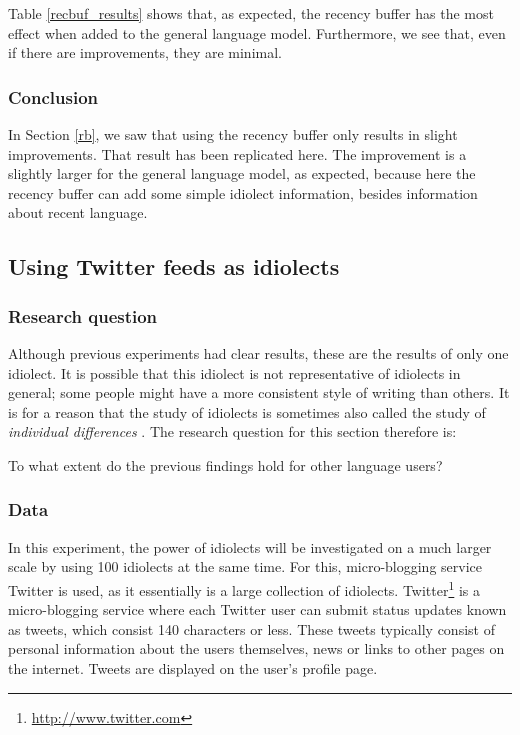 \documentclass[11pt]{article}
\begin{document}
Table \ref{recbuf_results} shows that, as expected, the recency buffer has the most effect when added to the general language model. Furthermore, we see that, even if there are improvements, they are minimal.

\subsubsection{Conclusion}
In Section \ref{rb}, we saw that using the recency buffer only results in slight improvements. That result has been replicated here. The improvement is a slightly larger for the general language model, as expected, because here the recency buffer can add some simple idiolect information, besides information about recent language.

\subsection{Using Twitter feeds as idiolects} \label{twitter_idiolects}

\subsubsection{Research question}
Although previous experiments had clear results, these are the results of only one idiolect. It is possible that this idiolect is not representative of idiolects in general; some people might have a more consistent style of writing than others. It is for a reason that the study of idiolects is sometimes also called the study of \emph{individual differences} \cite{barlow10}. The research question for this section therefore is:

\begin{examples}
\item To what extent do the previous findings hold for other language users?
\end{examples}

\subsubsection{Data} \label{data_twitter_idiolects}
In this experiment, the power of idiolects will be investigated on a much larger scale by using 100 idiolects at the same time. For this, micro-blogging service Twitter is used, as it essentially is a large collection of idiolects. Twitter\footnote{\url{http://www.twitter.com}} is a micro-blogging service where each Twitter user can submit status updates known as tweets, which consist 140 characters or less. These tweets typically consist of personal information about the users themselves, news or links to other pages on the internet. Tweets are displayed on the user's profile page. 
\end{document}
